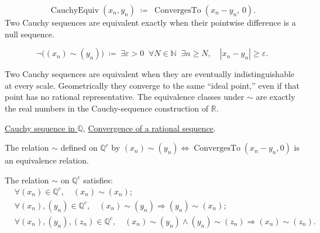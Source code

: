 \begin{remark*}
\[
\operatorname{CauchyEquiv}(x_n, y_n)
\;\coloneqq\;
\operatorname{ConvergesTo}(x_n - y_n,\, 0).
\]
Two Cauchy sequences are equivalent exactly when their pointwise difference
is a null sequence.
\end{remark*}

\begin{remark*}
\[
\neg\bigl((x_n) \sim (y_n)\bigr)
\;\coloneqq\;
\exists \varepsilon > 0 \;\; \forall N \in \mathbb{N} \;\; \exists n \geq N,
\quad |x_n - y_n| \geq \varepsilon.
\]
\end{remark*}

\begin{remark*}[Interpretation]
Two Cauchy sequences are equivalent when they are eventually indistinguishable
at every scale.  Geometrically they converge to the same ``ideal point,''
even if that point has no rational representative.  The equivalence classes
under $\sim$ are exactly the real numbers in the Cauchy-sequence construction
of $\mathbb{R}$.
\end{remark*}

\begin{remark*}[Dependencies]
\hyperref[def:cauchy-rational]{Cauchy sequence in $\mathbb{Q}$},
\hyperref[def:convergent-rational-sequence]{Convergence of a rational sequence}.
\end{remark*}

\begin{tcolorbox}[colback=thmbox, colframe=thmborder, arc=2pt,
  left=6pt, right=6pt, top=4pt, bottom=4pt,
  title={\small\textbf{Theorem (The Cauchy Equivalence Relation on $\mathbb{Q}^c$)}},
  fonttitle=\small\bfseries]
\begin{theorem}
\label{thm:cauchy-equivalence-is-equivalence}
The relation $\sim$ defined on $\mathbb{Q}^c$ by
$(x_n) \sim (y_n) \Longleftrightarrow \operatorname{ConvergesTo}(x_n - y_n, 0)$
is an equivalence relation.
\end{theorem}
\end{tcolorbox}

\begin{remark*}
The relation $\sim$ on $\mathbb{Q}^c$ satisfies:
\begin{align*}
&\forall (x_n) \in \mathbb{Q}^c,\quad (x_n) \sim (x_n); \\
&\forall (x_n),(y_n) \in \mathbb{Q}^c,\quad
  (x_n) \sim (y_n) \Longrightarrow (y_n) \sim (x_n); \\
&\forall (x_n),(y_n),(z_n) \in \mathbb{Q}^c,\quad
  (x_n) \sim (y_n) \land (y_n) \sim (z_n)
  \Longrightarrow (x_n) \sim (z_n).
\end{align*}
\end{remark*}

